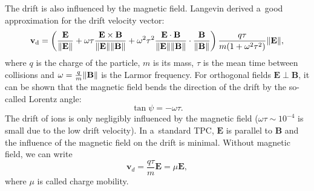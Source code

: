 			The drift is also influenced by the magnetic field. Langevin derived a~good approximation for the drift velocity vector:
				\begin{equation}
					\label{eq:drift}
					\mathbf{v}_\text{d} = \left(\frac{\mathbf{E}}{\norm{\mathbf{E}}} + \omega\tau\frac{\mathbf{E}\times\mathbf{B}}{\norm{\mathbf{E}}\norm{\mathbf{B}}} + \omega^2\tau^2\frac{\mathbf{E}\cdot\mathbf{B}}{\norm{\mathbf{E}}\norm{\mathbf{B}}}\cdot \frac{\mathbf{B}}{\norm{\mathbf{B}}}\right) \frac{q\tau}{m(1+\omega^2\tau^2)}\norm{\mathbf{E}},
				\end{equation}
			where $q$ is the charge of the particle, $m$ is its mass, $\tau$ is the mean time between collisions and $\omega = \frac{q}{m}\norm{\mathbf{B}}$ is the Larmor frequency. For orthogonal fields $\mathbf{E}\perp\mathbf{B}$, it can be shown that the magnetic field bends the direction of the drift by the so\nobreakdash-called Lorentz angle:
				\begin{equation}
					\label{eq:lorentz}
					\tan\psi = -\omega\tau.
				\end{equation}
			The drift of ions is only negligibly influenced by the magnetic field ($\omega\tau\sim10^{-4}$ is small due to the low drift velocity). In a~standard \ac{TPC}, $\mathbf{E}$ is parallel to $\mathbf{B}$ and the influence of the magnetic field on the drift is minimal. Without magnetic field, we can write
				\begin{equation}
					\mathbf{v}_d = \frac{q\tau}{m} \mathbf{E} = \mu \mathbf{E},
				\end{equation}
			where $\mu$ is called charge mobility.
			
